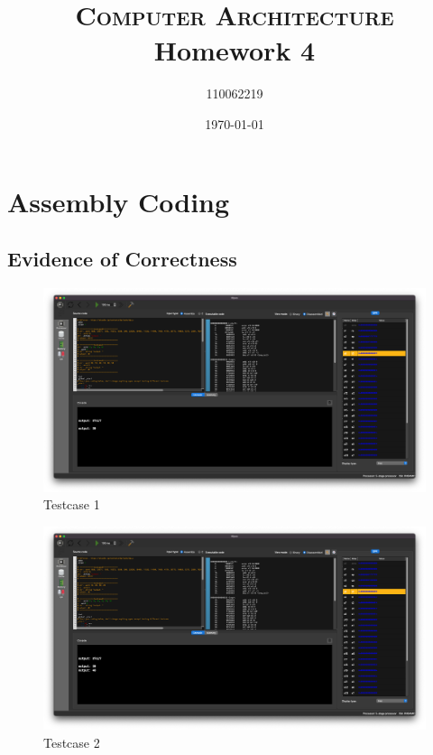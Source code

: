\documentclass[12pt, a4paper]{article}
\title{\textsc{Computer Architecture} Homework 4}
\author{110062219}
\date{\today}
\begin{document}
\maketitle

\tableofcontents

\section{Assembly Coding}

\subsection{Evidence of Correctness}

\begin{figure}[H]
\centering
\includegraphics[width=\linewidth]{tc1}
\caption{Testcase 1}
\label{fig:tc1}
\end{figure}

\begin{figure}[H]
\centering
\includegraphics[width=\linewidth]{tc2}
\caption{Testcase 2}
\label{fig:tc2}
\end{figure}

\pagebreak[4]
\end{document}
